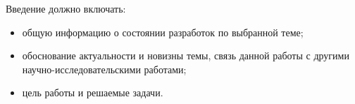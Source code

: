 \documentclass[14pt]{extreport}
\begin{document}

% 

\tableofcontents

\intro
Введение должно включать:
\begin{itemize}
\item общую информацию о состоянии разработок по выбранной теме;  
\item обоснование актуальности и новизны темы, связь данной работы с другими научно-исследовательскими работами;
\item цель работы и решаемые задачи. 
\end{itemize}



\conclusions


\nocite{*}


\Appendix %
\end{document}
